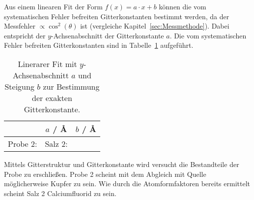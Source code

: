 Aus einem linearen Fit der Form $f(x) = a \cdot x + b$ können die vom
systematischen Fehler befreiten  
Gitterkonstanten bestimmt werden, da der Messfehler $\propto \cos^2(\theta)$ ist
(vergleiche Kapitel~\ref{sec:Messmethode}).
Dabei entspricht der $y$-Achsenabschnitt der Gitterkonstante $a$.
Die vom systematischen Fehler befreiten Gitterkonstanten sind in Tabelle~\ref{tab:gitt} aufgeführt.

\begin{table}[ht]
		\centering
		\caption{Linerarer Fit mit $y$-Achsenabschnitt $a$ und Steigung $b$ zur
				Bestimmung der exakten Gitterkonstante.}
		\label{tab:gitt}
		\begin{tabular}{l c c}
				\toprule
        & $a$ / \AA & $b$ / \AA \\
				\midrule
				Probe 2: 	& 
				Salz 2: 	& 
				\bottomrule
		\end{tabular}
\end{table}

Mittels Gitterstruktur und Gitterkonstante wird versucht die Bestandteile der
Probe zu erschließen. 
Probe 2 scheint mit dem Abgleich mit Quelle \cite{kupfer} möglicherweise Kupfer
zu sein. 
Wie durch die Atomformfaktoren bereits ermittelt scheint Salz 2 Calciumfluorid
zu sein. 
